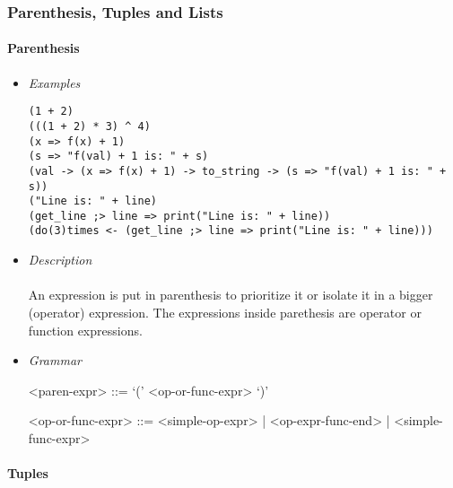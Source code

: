 \documentclass{article}
\begin{document}
\newpage
\subsubsection{Parenthesis, Tuples and Lists}

\paragraph{Parenthesis}

\begin{itemize}

\item \textit{Examples}
\begin{verbatim}
(1 + 2)
(((1 + 2) * 3) ^ 4)
(x => f(x) + 1)
(s => "f(val) + 1 is: " + s)
(val -> (x => f(x) + 1) -> to_string -> (s => "f(val) + 1 is: " + s))
("Line is: " + line)
(get_line ;> line => print("Line is: " + line))
(do(3)times <- (get_line ;> line => print("Line is: " + line)))
\end{verbatim}

\item \textit{Description} \\\\
An expression is put in parenthesis to prioritize it or isolate it in a bigger
(operator) expression. The expressions inside parethesis are operator
or function expressions.

\item \textit{Grammar}
\begin{grammar}
<paren-expr> ::= `(' <op-or-func-expr> `)'  

<op-or-func-expr> ::=
<simple-op-expr> | <op-expr-func-end> | <simple-func-expr>
\end{grammar}

\end{itemize}

\paragraph{Tuples}
\end{document}
